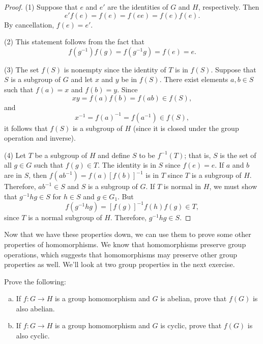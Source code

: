  
\begin{proof}

 
(1)
Suppose that $e$ and $e'$ are the identities of $G$ and $H$,
respectively. Then
\[
e' f(e) = f(e) = f(e e) = f(e) f(e).
\]
By cancellation, $f(e) = e'$.
 
 
(2)
This statement follows from the fact that
\[
f( g^{-1}) f(g) = f(g^{-1} g) = f(e) = e.
\]
 
 
(3)
The set $f(S)$ is nonempty since the identity of $T$ is in
$f(S)$.
Suppose that $S$ is a subgroup of $G$ and let $x$ and $y$ be in
$f(S)$. There exist elements $a, b \in S$ such that $f(a) =
x$ and $f(b)=y$. Since 
\[
xy = f(a) f(b) = f(a b ) \in f(S),
\]
and
\[
x^{-1} = f(a)^{-1} = f(a^{-1}) \in f(S),
\]
it follows that $f(S)$ is a subgroup of $H$ (since it is closed under the group operation and inverse).
  
(4)
Let $T$ be a subgroup of $H$ and define $S$ to be
$f^{-1}(T)$; that is, $S$ is the set of all $g \in G$ such
that $f(g) \in T$.  The identity is in $S$ since $f(e) = e$.
If $a$ and $b$ are in $S$, then $f(ab^{-1}) = f(a)[ f(b)
]^{-1}$ is in $T$ since $T$ is a subgroup of $H$.  Therefore,
$ab^{-1} \in S$ and $S$ is a subgroup of $G$. If $T$ is normal
in $H$, we must show that $g^{-1} h g \in S$ for $h \in S$ and
$g \in G_1$. But 
\[
f( g^{-1} h g) = [ f(g) ]^{-1} f( h ) f( g ) \in
T,
\]
since $T$ is a normal subgroup of $H$.  Therefore, $g^{-1}hg \in
S$.
\end{proof}

Now that we have these properties down, we can use them to prove some other properties of homomorphisms.  
We know that homomorphisms preserve  group operations, which suggests that homomorphisms may preserve other group properties as well. We'll look at two group properties in the next exercise.

 
\begin{exercise}\label{exercise:homomorph:homo_abelian_cyclic}
Prove the following:
\begin{enumerate}[(a)]
\item
If $f : G \rightarrow H$ is a group homomorphism and $G$ is
abelian, prove that $f(G)$ is also abelian. 
 
\item
If $f : G \rightarrow H$ is a group homomorphism and $G$ is cyclic,
prove that $f(G)$ is also cyclic. 
\end{enumerate}
\end{exercise} 

